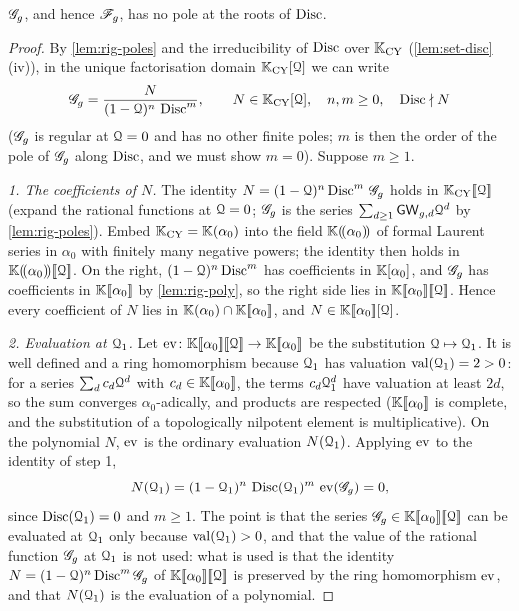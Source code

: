 \begin{lem}[no pole on $\Disc=0$]
\label{lem:rig-disc}
$\mathscr{G}_g$, and hence $\mathscr{F}_g$, has no pole at the roots of $\operatorname{Disc}$.
\end{lem}

\begin{proof}
By \cref{lem:rig-poles} and the irreducibility of $\operatorname{Disc}$ over $\mathbb{K}_{\mathrm{CY}}$ (\cref{lem:set-disc}(iv)), in the unique factorisation domain $\mathbb{K}_{\mathrm{CY}}[\mathcal{Q}]$ we can write
\begin{equation}
\label{eq:rig-NG}
\mathscr{G}_g=\frac{N}{(1-\mathcal{Q})^n\,\operatorname{Disc}^m},\qquad N\in\mathbb{K}_{\mathrm{CY}}[\mathcal{Q}],\quad n,m\geq 0,\quad \operatorname{Disc}\nmid N
\end{equation}
($\mathscr{G}_g$ is regular at $\mathcal{Q}=0$ and has no other finite poles; $m$ is then the order of the pole of $\mathscr{G}_g$ along $\operatorname{Disc}$, and we must show $m=0$). Suppose $m\geq 1$.

\emph{1. The coefficients of $N$.} The identity $N=(1-\mathcal{Q})^n\operatorname{Disc}^m\,\mathscr{G}_g$ holds in $\mathbb{K}_{\mathrm{CY}}[\![ \mathcal{Q} ]\!]$ (expand the rational functions at $\mathcal{Q}=0$; $\mathscr{G}_g$ is the series $\sum_{d\geq 1}\mathsf{GW}_{g,d}\mathcal{Q}^d$ by \cref{lem:rig-poles}). Embed $\mathbb{K}_{\mathrm{CY}}=\mathbb{K}(\alpha_0)$ into the field $\mathbb{K}(\!(\alpha_0)\!)$ of formal Laurent series in $\alpha_0$ with finitely many negative powers; the identity then holds in $\mathbb{K}(\!(\alpha_0)\!)[\![ \mathcal{Q} ]\!]$. On the right, $(1-\mathcal{Q})^n\operatorname{Disc}^m$ has coefficients in $\mathbb{K}[\alpha_0]$, and $\mathscr{G}_g$ has coefficients in $\mathbb{K}[\![ \alpha_0 ]\!]$ by \cref{lem:rig-poly}, so the right side lies in $\mathbb{K}[\![ \alpha_0 ]\!][\![ \mathcal{Q} ]\!]$. Hence every coefficient of $N$ lies in $\mathbb{K}(\alpha_0)\cap\mathbb{K}[\![ \alpha_0 ]\!]$, and $N\in\mathbb{K}[\![ \alpha_0 ]\!][\mathcal{Q}]$.

\emph{2. Evaluation at $\mathcal{Q}_1$.} Let $\operatorname{ev}\colon\mathbb{K}[\![ \alpha_0 ]\!][\![ \mathcal{Q} ]\!]\to\mathbb{K}[\![ \alpha_0 ]\!]$ be the substitution $\mathcal{Q}\mapsto\mathcal{Q}_1$. It is well defined and a ring homomorphism because $\mathcal{Q}_1$ has valuation $\operatorname{val}(\mathcal{Q}_1)=2>0$: for a series $\sum_dc_d\mathcal{Q}^d$ with $c_d\in\mathbb{K}[\![ \alpha_0 ]\!]$, the terms $c_d\mathcal{Q}_1^d$ have valuation at least $2d$, so the sum converges $\alpha_0$-adically, and products are respected ($\mathbb{K}[\![ \alpha_0 ]\!]$ is complete, and the substitution of a topologically nilpotent element is multiplicative). On the polynomial $N$, $\operatorname{ev}$ is the ordinary evaluation $N(\mathcal{Q}_1)$. Applying $\operatorname{ev}$ to the identity of step 1,
\[
N(\mathcal{Q}_1)=(1-\mathcal{Q}_1)^n\,\operatorname{Disc}(\mathcal{Q}_1)^m\,\operatorname{ev}(\mathscr{G}_g)=0,
\]
since $\operatorname{Disc}(\mathcal{Q}_1)=0$ and $m\geq 1$. The point is that the series $\mathscr{G}_g\in\mathbb{K}[\![ \alpha_0 ]\!][\![ \mathcal{Q} ]\!]$ can be evaluated at $\mathcal{Q}_1$ only because $\operatorname{val}(\mathcal{Q}_1)>0$, and that the value of the rational function $\mathscr{G}_g$ at $\mathcal{Q}_1$ is not used: what is used is that the identity $N=(1-\mathcal{Q})^n\operatorname{Disc}^m\mathscr{G}_g$ of $\mathbb{K}[\![ \alpha_0 ]\!][\![ \mathcal{Q} ]\!]$ is preserved by the ring homomorphism $\operatorname{ev}$, and that $N(\mathcal{Q}_1)$ is the evaluation of a polynomial.


\end{proof}
